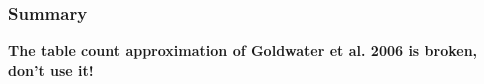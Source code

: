 \documentclass{beamer}
\begin{document}
\begin{frame}[t]
\begin{center}
\end{center}
\end{frame}

\begin{frame}
\frametitle{Summary}
\begin{center} 
  \Large \textbf{The table count approximation of Goldwater et al. 2006 
  is broken, \alert{don't use it!}}
\end{center}
\end{frame}
\end{document}
